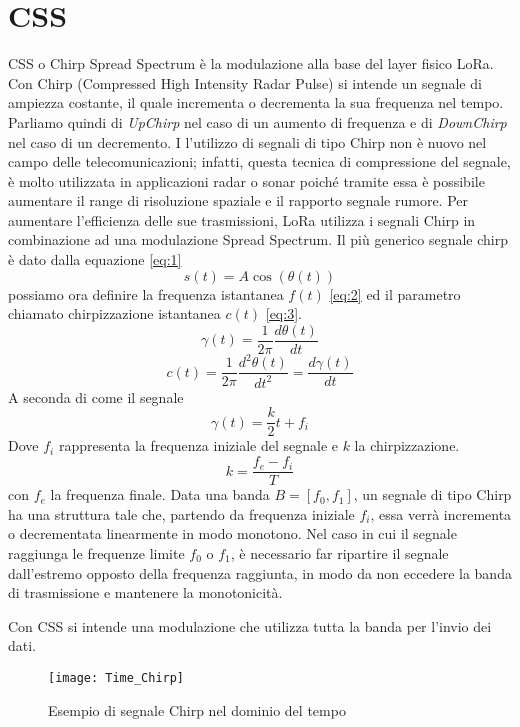 \section{CSS}
CSS o Chirp Spread Spectrum è la modulazione alla base del layer fisico LoRa. 
Con Chirp (Compressed High Intensity Radar Pulse) si intende un segnale di
ampiezza costante, il quale incrementa o decrementa la sua frequenza nel tempo.
Parliamo quindi di \emph{UpChirp} nel caso di un aumento di frequenza e di
\emph{DownChirp} nel caso di un decremento.
I l'utilizzo di segnali di tipo Chirp non è nuovo nel campo delle
telecomunicazioni; infatti, questa tecnica di compressione del segnale, 
è molto utilizzata in applicazioni radar o  sonar  poiché tramite essa è possibile aumentare il range
di risoluzione spaziale e il rapporto segnale rumore.
Per aumentare l'efficienza delle sue trasmissioni, LoRa utilizza i segnali Chirp in combinazione ad una
modulazione Spread Spectrum. 
Il più generico segnale chirp è dato dalla equazione \ref{eq:1}
\begin{equation}\label{eq:1}
        s(t) = A\cos(\theta (t))
\end{equation}
possiamo ora definire la frequenza istantanea $f(t)$ \ref{eq:2} ed il parametro
chiamato chirpizzazione istantanea $c(t)$ \ref{eq:3}.
\begin{equation}\label{eq:2}
        \gamma(t) = \frac{1}{2\pi} \frac{d\theta(t)}{dt}
\end{equation}
\begin{equation}\label{eq:3}
        c(t) = \frac{1}{2\pi} \frac{d^2\theta(t)}{dt^2} = \frac{d\gamma(t)}{dt}
\end{equation}
A seconda di come il segnale 
\begin{equation}
        \gamma(t) = \frac{k}{2}t+f_i
\end{equation}
Dove $f_i$ rappresenta la frequenza iniziale del segnale e $k$ la
chirpizzazione.
\begin{equation}
        k = \frac{f_e - f_i}{T}
\end{equation}
con $f_e$ la frequenza finale.
Data una banda $B = [f_0, f_1]$, un segnale di tipo Chirp ha una struttura tale
che, partendo da frequenza iniziale $f_i$, essa verrà incrementa o decrementata
linearmente in modo monotono. Nel caso in cui il segnale raggiunga le frequenze
limite $f_0$ o $f_1$, è necessario far ripartire il segnale dall'estremo opposto
della frequenza raggiunta, in modo da non eccedere la banda di trasmissione e
mantenere la monotonicità.

Con CSS si intende una modulazione che utilizza tutta la banda per l'invio dei
dati.
\begin{figure}[h]
        \centering
                \texttt{[image: Time\_Chirp]}
        \caption{Esempio di segnale Chirp nel dominio del tempo}
\end{figure}

